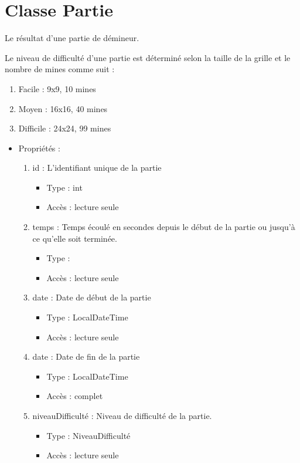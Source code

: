 \section{Classe Partie}

Le résultat d'une partie de démineur.

Le niveau de difficulté d'une partie est déterminé selon la taille de la grille et le nombre de mines comme suit :

\begin{enumerate}
\item Facile : 9x9, 10 mines
\item Moyen : 16x16, 40 mines
\item Difficile : 24x24, 99 mines
\end{enumerate}

\begin{itemize}
\item Propriétés : 
  \begin{enumerate}
  \item id : L'identifiant unique de la partie
    \begin{itemize}
    \item Type : int
    \item Accès : lecture seule
    \end{itemize}
  \item temps : Temps écoulé en secondes depuis le début de la partie ou jusqu'à ce qu'elle soit terminée.
    \begin{itemize}
    \item Type : 
    \item Accès : lecture seule
    \end{itemize}
  \item date : Date de début de la partie
    \begin{itemize}
    \item Type : LocalDateTime
    \item Accès : lecture seule
    \end{itemize}
  \item date : Date de fin de la partie
    \begin{itemize}
    \item Type : LocalDateTime
    \item Accès : complet
    \end{itemize}
  \item niveauDifficulté : Niveau de difficulté de la partie.
    \begin{itemize}
    \item Type : NiveauDifficulté
    \item Accès : lecture seule
    \end{itemize}


\end{enumerate}
\end{itemize}
